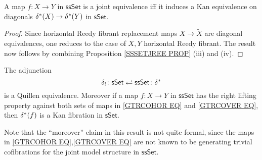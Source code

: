 \documentclass[a4paper,10pt
,draft
]{article}%
\begin{document}
\begin{corollary}\label{WEAKDIAG COR}
	A map $f\colon X \to Y$ in $\mathsf{ssSet}$ is a joint equivalence iff it induces a Kan equivalence on diagonals
	$\delta^{\**}(X) \to \delta^{\**}(Y)$ in $\mathsf{sSet}$.
\end{corollary}

\begin{proof}
	Since horizontal Reedy fibrant replacement maps
	$X \to \tilde{X}$ are diagonal equivalences, 
	one reduces to the case of $X,Y$ horizontal Reedy fibrant. The result now follows by combining
	Proposition \ref{SSSETJREE PROP} (iii) and (iv). \end{proof}



\begin{corollary}\label{SSETSSETADJ COR}
	The adjunction
\[
	\delta_{!}\colon \mathsf{sSet} 
		\rightleftarrows 
	\mathsf{ssSet} \colon \delta^{\**}
\]
is a Quillen equivalence.
Moreover if a map $f\colon X \to Y$ in $\mathsf{ssSet}$ has the right lifting property
against both sets of maps in
\eqref{GTRCOHOR EQ} and \eqref{GTRCOVER EQ}, then
$\delta^{\**} (f)$ is a Kan fibration in $\mathsf{sSet}$.
\end{corollary}

Note that the ``moreover'' claim in this result is not quite formal, since the maps in \eqref{GTRCOHOR EQ},\eqref{GTRCOVER EQ} are not known to be generating trivial cofibrations for the joint model structure in $\mathsf{ssSet}$.
\end{document}
